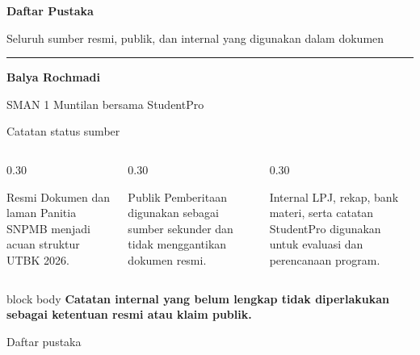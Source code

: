 \renewcommand{\currentchapter}{Referensi}

\begingroup
{}
\begin{frame}[plain]
  \vspace{0.65cm}
  \vspace{0.08cm}
  {\color{StudentWhite}\bfseries\fontsize{28}{33}\selectfont Daftar Pustaka\par}
  \vspace{0.38cm}
  {\color{StudentSoft}\fontsize{14.5}{18}\selectfont Seluruh sumber resmi, publik, dan internal yang digunakan dalam dokumen}\par
  \vfill
  {\color{StudentGold}\rule{2.3cm}{2.5pt}}\par
  \vspace{0.20cm}
  {\color{StudentWhite}\bfseries\fontsize{15}{18}\selectfont Balya Rochmadi}\par
  {\color{StudentSoft}\fontsize{11.5}{14}\selectfont SMAN 1 Muntilan bersama StudentPro}
  \vspace{0.42cm}
\end{frame}
\endgroup

\begin{frame}{Catatan status sumber}
  \begin{columns}[T,onlytextwidth]
    \begin{column}{0.30\textwidth}
      \begin{block}{Resmi}
        Dokumen dan laman Panitia SNPMB menjadi acuan struktur UTBK 2026.
      \end{block}
    \end{column}
    \begin{column}{0.30\textwidth}
      \begin{block}{Publik}
        Pemberitaan digunakan sebagai sumber sekunder dan tidak menggantikan dokumen resmi.
      \end{block}
    \end{column}
    \begin{column}{0.30\textwidth}
      \begin{block}{Internal}
        LPJ, rekap, bank materi, serta catatan StudentPro digunakan untuk evaluasi dan perencanaan program.
      \end{block}
    \end{column}
  \end{columns}
  \vspace{0.26cm}
  \begin{beamercolorbox}[rounded=true,sep=0.18cm,wd=\textwidth]{block body}
    \centering\bfseries Catatan internal yang belum lengkap tidak diperlakukan sebagai ketentuan resmi atau klaim publik.
  \end{beamercolorbox}
\end{frame}

\nocite{*}
\begin{frame}[allowframebreaks]{Daftar pustaka}
  {\fontsize{9.2}{11.5}\selectfont
  
  }
\end{frame}
